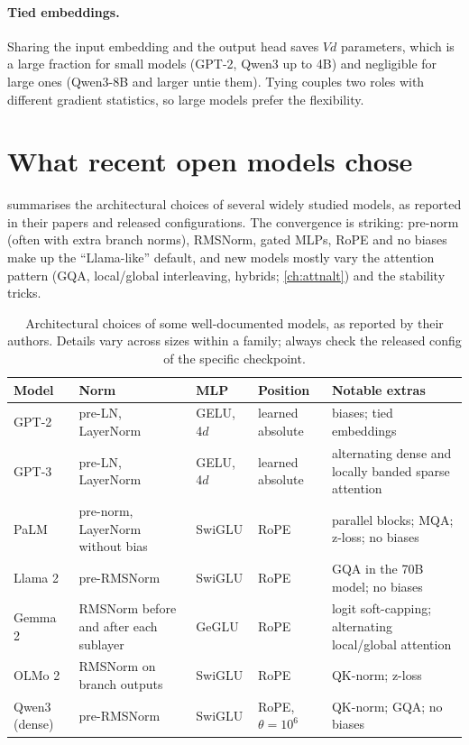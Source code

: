 \paragraph{Tied embeddings.} Sharing the input embedding and the output head saves $Vd$ parameters, which
is a large fraction for small models (GPT-2, Qwen3 up to 4B) and negligible for large ones (Qwen3-8B and
larger untie them). Tying couples two roles with different gradient statistics, so large models prefer
the flexibility.

\section{What recent open models chose}\label{sec:archdesign:survey}

 summarises the architectural choices of several widely studied models, as
reported in their papers and released configurations. The convergence is striking: pre-norm (often with
extra branch norms), RMSNorm, gated MLPs, RoPE and no biases make up the ``Llama-like'' default, and new
models mostly vary the attention pattern (GQA, local/global interleaving, hybrids;
\cref{ch:attnalt}) and the stability tricks.

\begin{table}[t]
\centering\small
\begin{tabularx}{\linewidth}{@{}l>{\raggedright\arraybackslash}X>{\raggedright\arraybackslash}X>{\raggedright\arraybackslash}X>{\raggedright\arraybackslash}X@{}}
\toprule
Model & Norm & MLP & Position & Notable extras\\
\midrule
GPT-2 & pre-LN, LayerNorm & GELU, 4$d$ & learned absolute & biases; tied embeddings\\
GPT-3 & pre-LN, LayerNorm & GELU, 4$d$ & learned absolute & alternating dense and locally banded sparse attention\\
PaLM & pre-norm, LayerNorm without bias & SwiGLU & RoPE & parallel blocks; MQA; z-loss; no biases\\
Llama 2 & pre-RMSNorm & SwiGLU & RoPE & GQA in the 70B model; no biases\\
Gemma 2 & RMSNorm before and after each sublayer & GeGLU & RoPE & logit soft-capping; alternating local/global attention\\
OLMo 2 & RMSNorm on branch outputs & SwiGLU & RoPE & QK-norm; z-loss\\
Qwen3 (dense) & pre-RMSNorm & SwiGLU & RoPE, $\theta=10^6$ & QK-norm; GQA; no biases\\
\bottomrule
\end{tabularx}
\caption{Architectural choices of some well-documented models, as reported by their authors. Details
vary across sizes within a family; always check the released config of the specific checkpoint.}
\label{tab:archdesign:survey}
\end{table}

